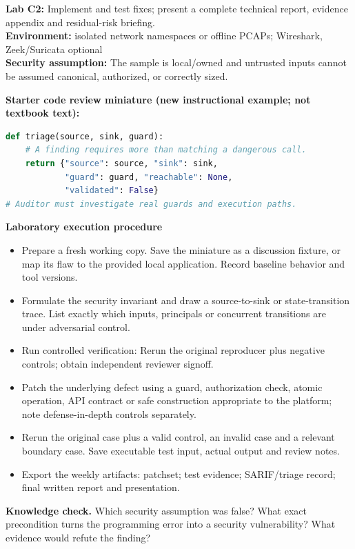 \documentclass[10pt,letterpaper]{article}
\begin{document}
\begin{insight}\textbf{Lab C2:} Implement and test fixes; present a complete technical report, evidence appendix and residual-risk briefing.\\\textbf{Environment:} isolated network namespaces or offline PCAPs; Wireshark, Zeek/Suricata optional\\\textbf{Security assumption:} The sample is local/owned and untrusted inputs cannot be assumed canonical, authorized, or correctly sized.\end{insight}
\textbf{Starter code review miniature (new instructional example; not textbook text):}
\begin{lstlisting}[language=Python]
def triage(source, sink, guard):
    # A finding requires more than matching a dangerous call.
    return {"source": source, "sink": sink,
            "guard": guard, "reachable": None,
            "validated": False}
# Auditor must investigate real guards and execution paths.
\end{lstlisting}
\textbf{Laboratory execution procedure}
\begin{itemize}[leftmargin=*,itemsep=2pt]
\item Prepare a fresh working copy. Save the miniature as a discussion fixture, or map its flaw to the provided local application. Record baseline behavior and tool versions.
\item Formulate the security invariant and draw a source-to-sink or state-transition trace. List exactly which inputs, principals or concurrent transitions are under adversarial control.
\item Run controlled verification: Rerun the original reproducer plus negative controls; obtain independent reviewer signoff.
\item Patch the underlying defect using a guard, authorization check, atomic operation, API contract or safe construction appropriate to the platform; note defense-in-depth controls separately.
\item Rerun the original case plus a valid control, an invalid case and a relevant boundary case. Save executable test input, actual output and review notes.
\item Export the weekly artifacts: patchset; test evidence; SARIF/triage record; final written report and presentation.
\end{itemize}
\textbf{Knowledge check.} Which security assumption was false? What exact precondition turns the programming error into a security vulnerability? What evidence would refute the finding?
\end{document}
